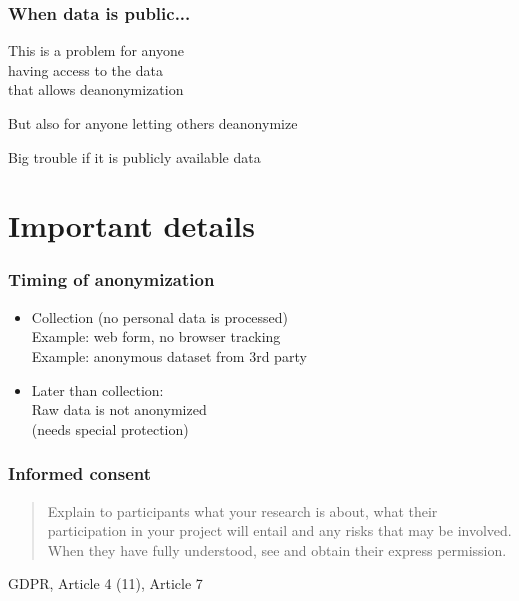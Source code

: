 \documentclass[17pt,aspectratio=169,hyperref={pdfusetitle,colorlinks,allcolors=olive}]{beamer}
\begin{document}
\begin{frame}[fragile]
  \frametitle{When data is public...}

  This is a problem for anyone \\
  having access to the data \\
  that allows deanonymization \\

  \vspace{.5cm}
  
  But also for anyone letting others deanonymize \\

  \vspace{.5cm}
  
  Big trouble if it is publicly available data \\
  
\end{frame}


\section{Important details}

\begin{frame}[fragile]
  \frametitle{Timing of anonymization}

  \begin{itemize}
  \item Collection (no personal data is processed) \\
    Example: web form, no browser tracking \\
    Example: anonymous dataset from 3rd party \\
  \item Later than collection: \\
    Raw data is not anonymized \\
    (needs special protection) \\
  \end{itemize}
  
\end{frame}

\begin{frame}[fragile]
  \frametitle{Informed consent}

  \begin{quote}
  Explain to participants what your research is about, what their participation in your project will entail and any risks that may be involved. When they have fully understood, see and obtain their express permission.
  \end{quote}

  \begin{flushright}
  GDPR, Article 4 (11), Article 7
  \end{flushright}
\end{frame}
\end{document}
